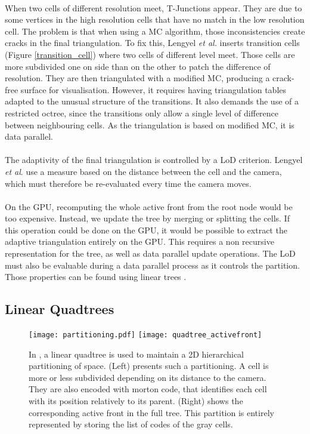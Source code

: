 \paragraph{}
When two cells of different resolution meet, T-Junctions appear.
They are due to some vertices in the high resolution cells that have no match in the low resolution cell.
The problem is that when using a MC algorithm, those inconsistencies create cracks in the final triangulation.
To fix this, Lengyel \textit{et al.} inserts transition cells (Figure \ref{transition_cell}) where two cells of different level meet.
Those cells are more subdivided one on side than on the other to patch the difference of resolution.
They are then triangulated with a modified MC, producing a crack-free surface for visualisation.
However, it requires having triangulation tables adapted to the unusual structure of the transitions.
It also demands the use of a restricted octree, since the transitions only allow a single level of difference between neighbouring cells.
As the triangulation is based on modified MC, it is data parallel.

\paragraph{}
The adaptivity of the final triangulation is controlled by a LoD criterion.
Lengyel \textit{et al}. use a measure based on the distance between the cell and the camera, which must therefore be re-evaluated every time the camera moves.

\paragraph{}
On the GPU, recomputing the whole active front from the root node would be too expensive.
Instead, we update the tree by merging or splitting the cells.
If this operation could be done on the GPU, it would be possible to extract the adaptive triangulation entirely on the GPU.
This requires a non recursive representation for the tree, as well as data parallel update operations.
The LoD must also be evaluable during a data parallel process as it controls the partition.
Those properties can be found using linear trees \cite{dupuy2014quadtrees}.


\subsection{Linear Quadtrees}

\begin{figure}
\centering
\texttt{[image: partitioning.pdf]}
\hfill
\texttt{[image: quadtree\_activefront]}
\caption{In \cite{dupuy2014quadtrees}, a linear quadtree is used to maintain a 2D hierarchical partitioning of space.
(Left) presents such a partitioning.
A cell is more or less subdivided depending on its distance to the camera.
They are also encoded with morton code, that identifies each cell with its position relatively to its parent.
(Right) shows the corresponding active front in the full tree.
This partition is entirely represented by storing the list of codes of the gray cells. }
\label{fig_quadtree_partitionning}
\end{figure}


